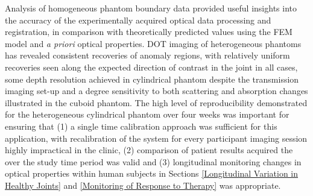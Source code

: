 \documentclass[twoside]{bhamthesis}
\theoremstyle{definition}
\begin{document}
Analysis of homogeneous phantom boundary data provided useful insights into the accuracy of the experimentally acquired optical data processing and registration, in comparison with theoretically predicted values using the FEM model and \textit{a priori} optical properties. DOT imaging of heterogeneous phantoms has revealed consistent recoveries of anomaly regions, with relatively uniform recoveries seen along the expected direction of contrast in the joint in all cases, some depth resolution achieved in cylindrical phantom despite the transmission imaging set-up and a degree sensitivity to both scattering and absorption changes illustrated in the cuboid phantom. The high level of reproducibility demonstrated for the heterogeneous cylindrical phantom over four weeks was important for ensuring that (1) a single time calibration approach was sufficient for this application, with recalibration of the system for every participant imaging session highly impractical in the clinic, (2) comparison of patient results acquired the over the study time period was valid and (3) longitudinal monitoring changes in optical properties within human subjects in Sections \ref{Longitudinal Variation in Healthy Joints} and \ref{Monitoring of Response to Therapy} was appropriate. 
\end{document}

